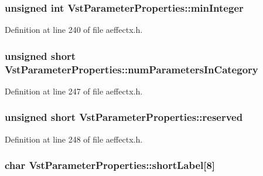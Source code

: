 \subsubsection[{\texorpdfstring{min\+Integer}{minInteger}}]{\setlength{\rightskip}{0pt plus 5cm}unsigned {\bf int} Vst\+Parameter\+Properties\+::min\+Integer}\hypertarget{class_vst_parameter_properties_a575e26f6313f8d4f8eff16b442c3b2bc}{}\label{class_vst_parameter_properties_a575e26f6313f8d4f8eff16b442c3b2bc}


Definition at line 240 of file aeffectx.\+h.

\subsubsection[{\texorpdfstring{num\+Parameters\+In\+Category}{numParametersInCategory}}]{\setlength{\rightskip}{0pt plus 5cm}unsigned short Vst\+Parameter\+Properties\+::num\+Parameters\+In\+Category}\hypertarget{class_vst_parameter_properties_ad38ce97d523e85cfa013c7864dea1531}{}\label{class_vst_parameter_properties_ad38ce97d523e85cfa013c7864dea1531}


Definition at line 247 of file aeffectx.\+h.

\subsubsection[{\texorpdfstring{reserved}{reserved}}]{\setlength{\rightskip}{0pt plus 5cm}unsigned short Vst\+Parameter\+Properties\+::reserved}\hypertarget{class_vst_parameter_properties_a1e35755bb1156dc1f61506816bf17eaa}{}\label{class_vst_parameter_properties_a1e35755bb1156dc1f61506816bf17eaa}


Definition at line 248 of file aeffectx.\+h.

\subsubsection[{\texorpdfstring{short\+Label}{shortLabel}}]{\setlength{\rightskip}{0pt plus 5cm}char Vst\+Parameter\+Properties\+::short\+Label\mbox{[}8\mbox{]}}\hypertarget{class_vst_parameter_properties_ae956cd75967859f11570b1d5e224b4ee}{}\label{class_vst_parameter_properties_ae956cd75967859f11570b1d5e224b4ee}


